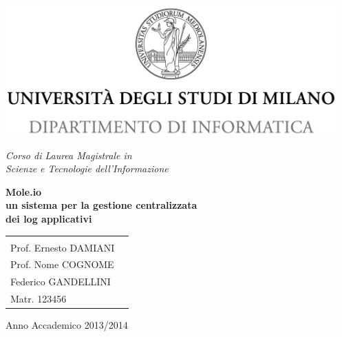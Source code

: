 \begin{titlepage}
  \begin{center}
    \includegraphics[height=5.0cm]{minerva_2013_DI.jpg}
    
    \vspace*{.4cm}
    {\Large 
      \emph{Corso di Laurea Magistrale in\\[.3cm]
        Scienze e Tecnologie dell'Informazione}
    }
    \vfill
    \begin{LARGE}
      \textbf{Mole.io\\[0.4cm]
        un sistema per la gestione centralizzata\\[0.6cm]
        dei log applicativi}
    \end{LARGE}
    
    \vfill
    \begin{minipage}{.99\linewidth}
      \begin{tabular}{l r}
        \begin{minipage}{.4\linewidth}
          \begin{flushleft}
            {\large
              RELATORE\\[.3cm]
              Prof. Ernesto DAMIANI
            }
            
            \vspace*{1.5cm}
            {\large
              CORRELATORE\\[.3cm]
              Prof. Nome COGNOME
            }
          \end{flushleft}
        \end{minipage}
        &
        \begin{minipage}{.6\linewidth}
          \begin{flushright}
            {\large
              TESI DI LAUREA DI\\[.3cm]
              Federico GANDELLINI\\[.45cm]
              Matr. 123456
            }
          \end{flushright}
        \end{minipage}
      \end{tabular}
    \end{minipage}
    
    \vfill
    {\large{{Anno Accademico 2013/2014}}}
  \end{center}
\end{titlepage}
